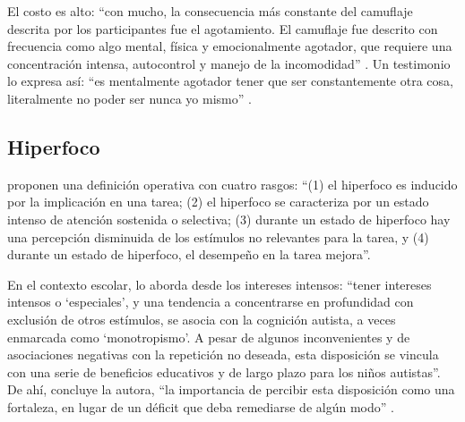 El costo es alto: \enquote{con mucho, la consecuencia más constante del camuflaje descrita por los participantes fue el agotamiento. El camuflaje fue descrito con frecuencia como algo mental, física y emocionalmente agotador, que requiere una concentración intensa, autocontrol y manejo de la incomodidad} \citep{hull2017}. Un testimonio lo expresa así: \enquote{es mentalmente agotador tener que ser constantemente otra cosa, literalmente no poder ser nunca yo mismo} \citep{hull2017}.

\subsection{Hiperfoco}

\citet{ashinoff2021} proponen una definición operativa con cuatro rasgos: \enquote{(1) el hiperfoco es inducido por la implicación en una tarea; (2) el hiperfoco se caracteriza por un estado intenso de atención sostenida o selectiva; (3) durante un estado de hiperfoco hay una percepción disminuida de los estímulos no relevantes para la tarea, y (4) durante un estado de hiperfoco, el desempeño en la tarea mejora}.

En el contexto escolar, \citet[p.~34]{wood2021} lo aborda desde los intereses intensos: \enquote{tener intereses intensos o \enquote{especiales}, y una tendencia a concentrarse en profundidad con exclusión de otros estímulos, se asocia con la cognición autista, a veces enmarcada como \enquote{monotropismo}. A pesar de algunos inconvenientes y de asociaciones negativas con la repetición no deseada, esta disposición se vincula con una serie de beneficios educativos y de largo plazo para los niños autistas}. De ahí, concluye la autora, \enquote{la importancia de percibir esta disposición como una fortaleza, en lugar de un déficit que deba remediarse de algún modo} \citep{wood2021}.

